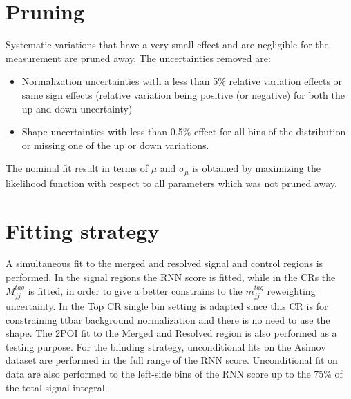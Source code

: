 \section{Pruning}
Systematic variations that have a very small effect and are negligible for the measurement are pruned away. The uncertainties removed are:
  \begin{itemize}
   \item  Normalization uncertainties with a less than 5$\%$ relative variation effects or same sign effects (relative variation being positive (or negative) for both the up and down uncertainty)
   \item  Shape uncertainties with less than 0.5$\%$ effect for all bins of the distribution or missing one of the up or down variations.
    \end{itemize}
    
The nominal fit result in terms of $\mu$ and $\sigma_{\mu}$ is obtained by maximizing the likelihood function with respect to all parameters which was not pruned away.

\section{Fitting strategy}
A simultaneous fit to the merged and resolved signal and control regions is performed. In the signal regions the RNN score is fitted, while in the CRs the $M^{tag}_{jj}$ is fitted, in order to give a better constrains to the $m^{tag}_{jj}$ reweighting uncertainty. In the Top CR single bin setting is adapted since this CR is for constraining ttbar background normalization and there is no need to use the shape. 
The 2POI fit to the Merged and Resolved region is also performed as a testing purpose. For the blinding strategy, unconditional fits on the Asimov dataset are performed in the full range of the RNN score. Unconditional fit on data are also performed to the left-side bins of the RNN score up to the 75\% of the total signal integral.
